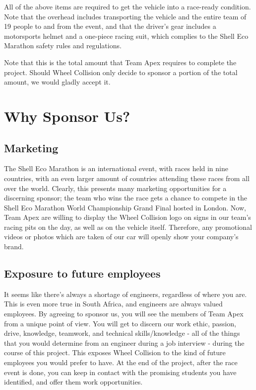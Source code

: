 \documentclass[a4paper, 12pt]{article}
\newcommand{\company}{Wheel Collision}
\begin{document}
		All of the above items are required to get the vehicle into a race-ready condition. Note that the overhead includes transporting the vehicle and the entire team of 19 people to and from the event, and that the driver's gear includes a motorsports helmet and a one-piece racing suit, which complies to the Shell Eco Marathon safety rules and regulations.\vspace*{1em}\par\noindent
		Note that this is the total amount that Team Apex requires to complete the project. Should \company{} only decide to sponsor a portion of the total amount, we would gladly accept it.

	\section{Why Sponsor Us?} %
	\label{sec:benefits_to_the_client}
		\subsection{Marketing} %
		\label{sub:marketing}
			The Shell Eco Marathon is an international event, with races held in nine countries, with an even larger amount of countries attending these races from all over the world. Clearly, this presents many marketing opportunities for a discerning sponsor; the team who wins the race gets a chance to compete in the Shell Eco Marathon World Championship Grand Final hosted in London. Now, Team Apex are willing to display the \company{} logo on signs in our team's racing pits on the day, as well as on the vehicle itself. Therefore, any promotional videos or photos which are taken of our car will openly show your company's brand.
		
		\subsection{Exposure to future employees} %
		\label{sub:exposure_to_future_employees}
			It seems like there's always a shortage of engineers, regardless of where you are. This is even more true in South Africa, and engineers are always valued employees. By agreeing to sponsor us, you will see the members of Team Apex from a unique point of view. You will get to discern our work ethic, passion, drive, knowledge, teamwork, and technical skills/knowledge - all of the things that you would determine from an engineer during a job interview - during the course of this project. This exposes \company{} to the kind of future employees you would prefer to have. At the end of the project, after the race event is done, you can keep in contact with the promising students you have identified, and offer them work opportunities.
\end{document}
